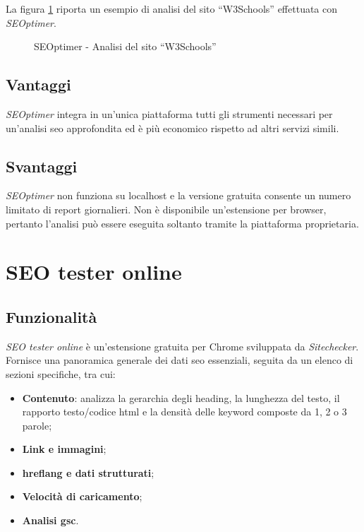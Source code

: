 \vspace{10pt}
\par\noindent La figura \ref{fig:seoptimer_w3schools} riporta un esempio di analisi del sito “W3Schools” effettuata con \textit{SEOptimer}.

\begin{figure}[H]
    \centering 
    \caption{SEOptimer - Analisi del sito “W3Schools”}
    \label{fig:seoptimer_w3schools}
\end{figure}

\subsection{Vantaggi}
\par \textit{SEOptimer} integra in un'unica piattaforma tutti gli strumenti necessari per un'analisi \gls{seo} approfondita ed è più economico rispetto ad altri servizi simili.

\subsection{Svantaggi}
\par \textit{SEOptimer} non funziona su \gls{localhost} e la versione gratuita consente un numero limitato di report giornalieri. Non è disponibile un'estensione per browser, pertanto l'analisi può essere eseguita soltanto tramite la piattaforma proprietaria.

\section{SEO tester online}

\subsection{Funzionalità}
\par \textit{SEO tester online} è un'estensione gratuita per Chrome sviluppata da \textit{Sitechecker}. Fornisce una panoramica generale dei dati \gls{seo} essenziali, seguita da un elenco di sezioni specifiche, tra cui:
\begin{itemize}
    \item \textbf{Contenuto}: analizza la gerarchia degli heading, la lunghezza del testo, il rapporto testo/codice \gls{html} e la densità delle keyword composte da 1, 2 o 3 parole;
    \item \textbf{Link e immagini};
    \item \textbf{\Gls{hreflang} e dati strutturati};
    \item \textbf{Velocità di caricamento};
    \item \textbf{Analisi \gls{gsc}}.
\end{itemize}

